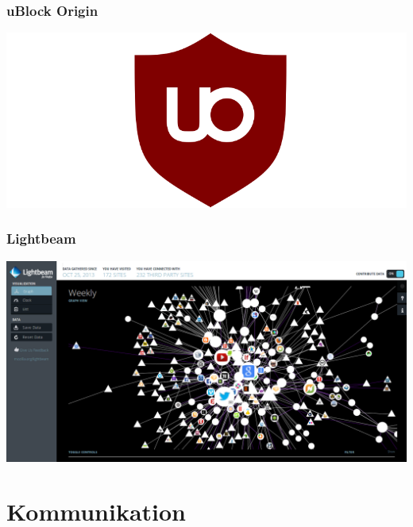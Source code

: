 \documentclass[12pt, table]{beamer}
\begin{document}
\begin{frame}
    \frametitle{uBlock Origin}
    \begin{center}
    	\includegraphics[height=0.7\textheight]{../img/ublock-edge-extension.png} 
	\end{center}       
\end{frame}

\begin{frame}
    \frametitle{Lightbeam}
    \begin{center}
    	\includegraphics[height=0.7\textheight]{../img/lightbeam.png}
    \end{center}
\end{frame}

\section{Kommunikation}
\subsection{}
\end{document}
